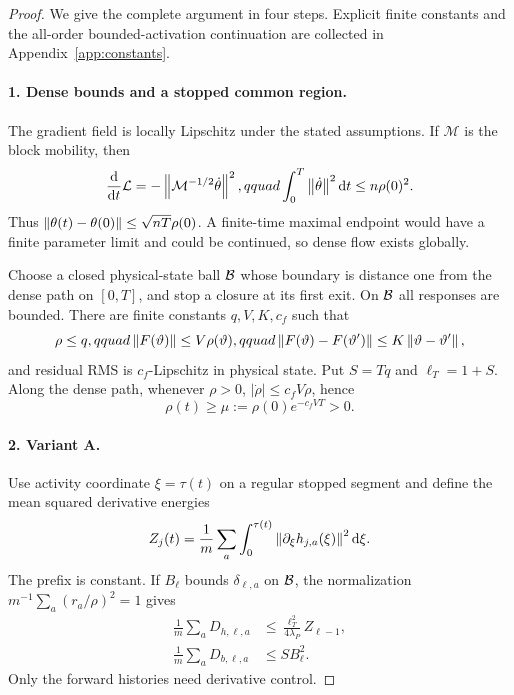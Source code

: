 \begin{proof}
We give the complete argument in four steps.  Explicit finite constants and
the all-order bounded-activation continuation are collected in
Appendix~\ref{app:constants}.

\paragraph{1. Dense bounds and a stopped common region.}
The gradient field is locally Lipschitz under the stated assumptions.  If
$\mathcal M$ is the block mobility, then
\begin{equation}
 \frac{\mathop{}\!\mathrm d}{\mathop{}\!\mathrm d t}\mathcal L
 =-\left\lVert \mathcal M^{-1/2}\dot\theta\right\rVert^2,qquad
 \int_0^T\left\lVert \dot\theta\right\rVert^2\mathop{}\!\mathrm d t\le n\rho(0)^2.
 \label{eq:dense-energy}
\end{equation}
Thus $\left\lVert \theta(t)-\theta(0)\right\rVert\le\sqrt{nT}\rho(0)$.  A finite-time
maximal endpoint would have a finite parameter limit and could be continued,
so dense flow exists globally.

Choose a closed physical-state ball $\mathcal B$ whose boundary is distance one from
the dense path on $[0,T]$, and stop a closure at its first exit.  On $\mathcal B$ all
responses are bounded.  There are finite constants $q,V,K,c_f$ such that
\begin{equation}
 \rho\le q,qquad \left\lVert F(\vartheta)\right\rVert\le V\rho(\vartheta),qquad
 \left\lVert F(\vartheta)-F(\vartheta')\right\rVert\le K\left\lVert \vartheta-\vartheta'\right\rVert,
 \label{eq:ball-bounds}
\end{equation}
and residual RMS is $c_f$-Lipschitz in physical state.  Put
$S=Tq$ and $\ell_T=1+S$.  Along the dense path, whenever $\rho>0$,
$|\dot\rho|\le c_fV\rho$, hence
\begin{equation}
 \rho(t)\ge\mu:=\rho(0)e^{-c_fVT}>0.
 \label{eq:rho-lower}
\end{equation}

\paragraph{2. Variant A.}
Use activity coordinate $\xi=\tau(t)$ on a regular stopped segment and define
the mean squared derivative energies
\begin{equation}
 Z_j(t)=\frac1m\sum_a\int_0^{\tau(t)}
 \left\lVert \partial_\xi h_{j,a}(\xi)\right\rVert^2\mathop{}\!\mathrm d\xi.
 \label{eq:Zj}
\end{equation}
The prefix is constant.  If $B_\ell$ bounds $\delta_{\ell,a}$ on $\mathcal B$, the
normalization $m^{-1}\sum_a(r_a/\rho)^2=1$ gives
\begin{align}
\frac1m\sum_aD_{h,\ell,a}
 &\le\frac{\ell_T^2}{4\lambda_P}Z_{\ell-1},
 \label{eq:A-Dh}\\
\frac1m\sum_aD_{b,\ell,a}
 &\le S B_\ell^2.
 \label{eq:A-Db}
\end{align}
Only the forward histories need derivative control.


\end{proof}
